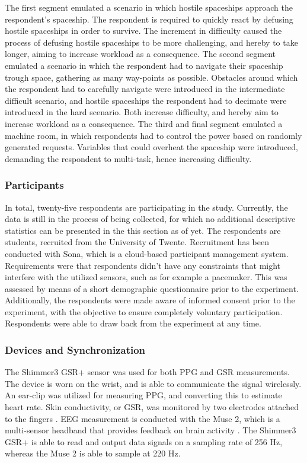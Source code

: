 \documentclass[12pt]{article}
\begin{document}
The first segment emulated a scenario in which hostile spaceships approach the respondent's spaceship. The respondent is required to  quickly react by defusing hostile spaceships in order to survive. The increment in difficulty caused the process of defusing hostile spaceships to be more challenging, and hereby to take longer,  aiming to increase workload as a consequence. The second segment emulated a scenario in which the respondent had to navigate their spaceship trough space, gathering as many way-points as possible. Obstacles around which the respondent had to carefully navigate were introduced in the intermediate difficult scenario, and hostile spaceships the respondent had to decimate were introduced in the hard scenario. Both increase difficulty, and hereby aim to increase workload as a consequence. The third and final segment emulated a machine room, in which respondents had to control the power based on randomly generated requests. Variables that could overheat the spaceship were introduced, demanding the respondent to multi-task, hence increasing difficulty. 

\subsubsection{Participants}
In total, twenty-five respondents are participating in the study. Currently, the data is still in the process of being collected, for which no additional descriptive statistics can be presented in the this section as of yet. The respondents are students, recruited from the University of Twente. Recruitment has been conducted with Sona, which is a cloud-based participant management system. Requirements were that respondents didn't have any constraints that might interfere with the utilized sensors, such as for example a pacemaker. This was assessed by means of a short demographic questionnaire prior to the experiment. Additionally, the respondents were made aware of informed consent prior to the experiment, with the objective to ensure completely voluntary participation. Respondents were able to draw back from the experiment at any time. 

\subsubsection{Devices and Synchronization}
The Shimmer3 GSR+ sensor was used for both PPG and GSR measurements. The device is worn on the wrist, and is able to communicate the signal wirelessly. An ear-clip was utilized for measuring PPG, and converting this to estimate heart rate. Skin conductivity, or GSR, was monitored by two electrodes attached to the fingers \cite{shimmer}. EEG measurement is conducted with the Muse 2, which is a multi-sensor headband that provides feedback on brain activity \cite{muse}. The Shimmer3 GSR+ is able to read and output data signals on a sampling rate of 256 Hz, whereas the Muse 2 is able to sample at 220 Hz. 
\end{document}
